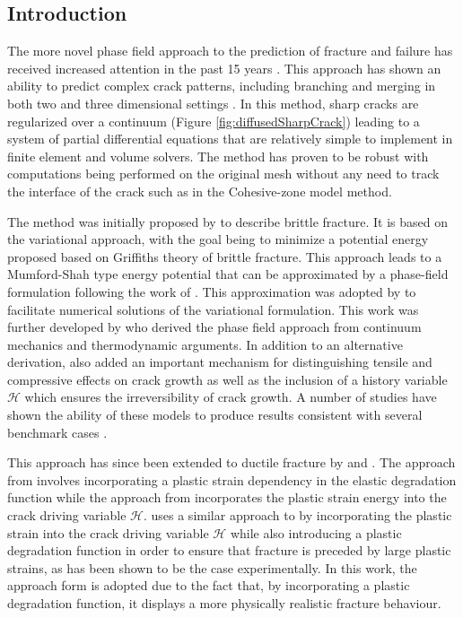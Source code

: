 \documentclass[sn-mathphys,Numbered,draft]{sn-jnl}%
\begin{document}
\subsection{Introduction}
The more novel phase field approach to the prediction of fracture and failure has received increased attention in the past 15 years \cite{borden_phase-field_2012,miehe_phase_2010,ambati_phase-field_2015,borden_phase-field_2016,miehe_phase_2016,dittmann_variational_2018,samaniego_phase-field_2021}. This approach has shown an ability to predict complex crack patterns, including branching and merging in both two and three dimensional settings \cite{borden_phase-field_2012,miehe_phase_2010}. In this method, sharp cracks are regularized over a continuum (Figure \ref{fig:diffusedSharpCrack}) leading to a system of partial differential equations that are relatively simple to implement in finite element and volume solvers. The method has proven to be robust with computations being performed on the original mesh without any need to track the interface of the crack such as in the Cohesive-zone model method.

The method was initially proposed by \citet{francfort_revisiting_1998} to describe brittle fracture. It is based on the variational approach, with the goal being to minimize a potential energy proposed based on Griffiths theory of brittle fracture. This approach leads to a Mumford-Shah \cite{mumford_optimal_1989} type energy potential that can be approximated by a phase-field formulation following the work of \citet{ambrosio_approximation_1990}. This approximation was adopted by \citet{bourdin_time-discrete_2011} to facilitate numerical solutions of the variational formulation. This work was further developed by \citet{miehe_phase_2010} who derived the phase field approach from continuum mechanics and thermodynamic arguments. In addition to an alternative derivation, \citet{miehe_phase_2010} also added an important mechanism for distinguishing tensile and compressive effects on crack growth as well as the inclusion of a history variable $\mathcal{H}$ which ensures the irreversibility of crack growth. A number of studies have shown the ability of these models to produce results consistent with several benchmark cases \cite{borden_phase-field_2012,miehe_phase_2010}.

This approach has since been extended to ductile fracture by \citet{ambati_phase-field_2015,borden_phase-field_2016} and \citet{miehe_phase_2016}. The approach from \citet{ambati_phase-field_2015} involves incorporating a plastic strain dependency in the elastic degradation function while the approach from \citet{miehe_phase_2016} incorporates the plastic strain energy into the crack driving variable $\mathcal{H}$. \citet{borden_phase-field_2016} uses a similar approach to \citet{miehe_phase_2016} by incorporating the plastic strain into the crack driving variable $\mathcal{H}$ while also introducing a plastic degradation function in order to ensure that fracture is preceded by large plastic strains, as has been shown to be the case experimentally. In this work, the approach form \citet{borden_phase-field_2016} is adopted due to the fact that, by incorporating a plastic degradation function, it displays a more physically realistic fracture behaviour.
\end{document}
